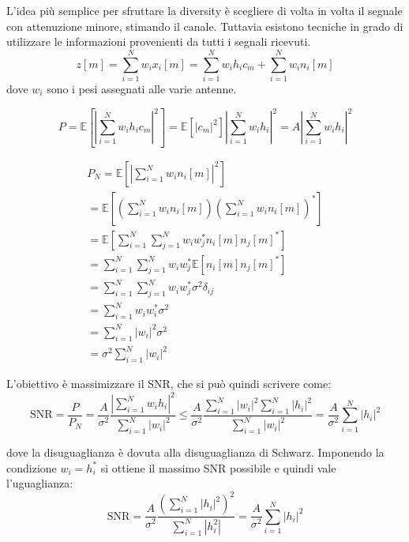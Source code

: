 L'idea più semplice per sfruttare la diversity è scegliere di volta in volta il segnale con attenuzione minore, stimando il canale.
Tuttavia esistono tecniche in grado di utilizzare le informazioni provenienti da tutti i segnali ricevuti.
\[
    z[m] = \sum_{i=1}^{N} w_i x_i[m] = \sum_{i=1}^{N} w_i h_i c_m + \sum_{i=1}^{N} w_i n_i[m]
\]
dove $w_i$ sono i pesi assegnati alle varie antenne.


\[
    P = \mathbb{E} \left[ \left| \sum_{i=1}^{N} w_i h_i c_m  \right|^2 \right] = \mathbb{E} \left[  |c_m|^2  \right] \left| \sum_{i=1}^{N} w_i h_i \right|^2 =  A \left| \sum_{i=1}^{N} w_i h_i \right|^2
\]

\[
    \begin{array}{ll}
            P_N = \mathbb{E} \left[ \left| \sum_{i=1}^{N} w_i n_i[m]  \right|^2 \right] \\
            = \mathbb{E} \left[ \left( \sum_{i=1}^{N} w_i n_i[m] \right)  \left( \sum_{i=1}^{N} w_i n_i[m] \right)^*  \right] \\
            = \mathbb{E} \left[  \sum_{i=1}^{N} \sum_{j=1}^{N} w_i w_j^* n_i[m] n_j[m]^*  \right] \\
            = \sum_{i=1}^{N} \sum_{j=1}^{N} w_i w_j^* \mathbb{E} \left[ n_i[m] n_j[m]^* \right] \\
            = \sum_{i=1}^{N} \sum_{j=1}^{N} w_i w_j^* \sigma^2 \delta_{ij} \\
            = \sum_{i=1}^{N} w_i w_i^* \sigma^2 \\
            = \sum_{i=1}^{N} |w_i|^2 \sigma^2 \\
            = \sigma^2 \sum_{i=1}^{N} |w_i|^2 
    \end{array}
\]

L'obiettivo è massimizzare il SNR, che si può quindi scrivere come:
\[
    \text{SNR} = \frac{P}{P_N} = \frac{A}{\sigma^2} \frac{\left|\sum_{i=1}^{N} w_i h_i \right|^2}{\sum_{i=1}^{N} \left| w_i \right|^2} \leq \frac{A}{\sigma^2} \frac{\sum_{i=1}^{N} |w_i|^2 \sum_{i=1}^{N} \left| h_i \right|^2}{\sum_{i=1}^{N} |w_i|^2} = \frac{A}{\sigma^2} \sum_{i=1}^{N} |h_i|^2
\]

dove la disuguaglianza è dovuta alla disuguaglianza di Schwarz. Imponendo la condizione $w_i = h_i^*$ si ottiene il massimo SNR possibile e quindi vale l'uguaglianza:
\[ 
    \text{SNR} = \frac{A}{\sigma^2} \frac{\left(\sum_{i=1}^{N} \left| h_i \right|^2 \right)^2}{\sum_{i=1}^{N} \left| h_i^2 \right|} = \frac{A}{\sigma^2} \sum_{i=1}^{N} |h_i|^2
\]


